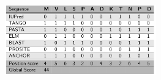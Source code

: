 \documentclass[portrait,final,paperwidth=90cm,paperheight=130cm,fontscale=0.295]{baposter}
\begin{document}
\begin{poster}
{\begin{minipage}{\linewidth}
\begin{minipage}{0.49\linewidth}
\vspace{10px}
\hspace{1.4em}
\includegraphics[width=0.89\linewidth, height=115px]{figures/tabla.png}
%  
\end{minipage}
\end{minipage}
}









\end{poster}
\end{document}
